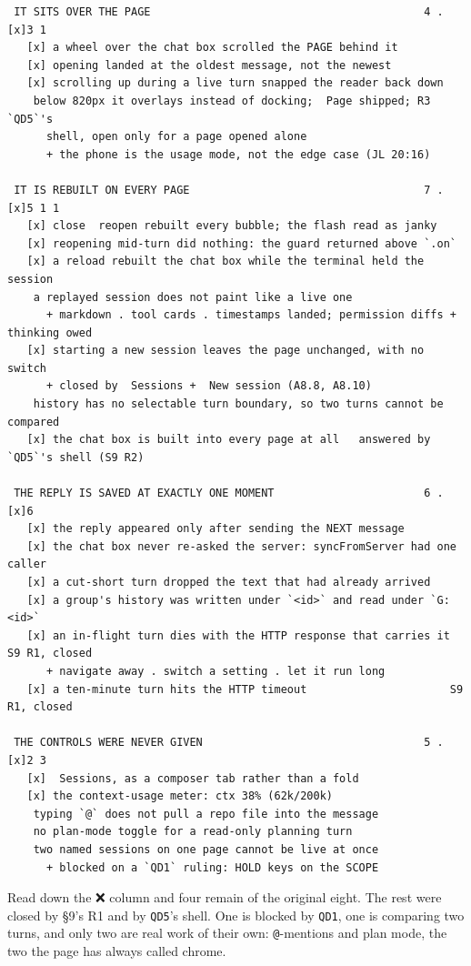 \begin{verbatim}
 IT SITS OVER THE PAGE                                          4 . [x]3 1
   [x] a wheel over the chat box scrolled the PAGE behind it
   [x] opening landed at the oldest message, not the newest
   [x] scrolling up during a live turn snapped the reader back down
    below 820px it overlays instead of docking;  Page shipped; R3  `QD5`'s
      shell, open only for a page opened alone
      + the phone is the usage mode, not the edge case (JL 20:16)

 IT IS REBUILT ON EVERY PAGE                                    7 . [x]5 1 1
   [x] close  reopen rebuilt every bubble; the flash read as janky
   [x] reopening mid-turn did nothing: the guard returned above `.on`
   [x] a reload rebuilt the chat box while the terminal held the session
    a replayed session does not paint like a live one
      + markdown . tool cards . timestamps landed; permission diffs +  thinking owed
   [x] starting a new session leaves the page unchanged, with no switch
      + closed by  Sessions +  New session (A8.8, A8.10)
    history has no selectable turn boundary, so two turns cannot be compared
   [x] the chat box is built into every page at all   answered by `QD5`'s shell (S9 R2)

 THE REPLY IS SAVED AT EXACTLY ONE MOMENT                       6 . [x]6
   [x] the reply appeared only after sending the NEXT message
   [x] the chat box never re-asked the server: syncFromServer had one caller
   [x] a cut-short turn dropped the text that had already arrived
   [x] a group's history was written under `<id>` and read under `G:<id>`
   [x] an in-flight turn dies with the HTTP response that carries it  S9 R1, closed
      + navigate away . switch a setting . let it run long
   [x] a ten-minute turn hits the HTTP timeout                      S9 R1, closed

 THE CONTROLS WERE NEVER GIVEN                                  5 . [x]2 3
   [x]  Sessions, as a composer tab rather than a fold
   [x] the context-usage meter: ctx 38% (62k/200k)
    typing `@` does not pull a repo file into the message
    no plan-mode toggle for a read-only planning turn
    two named sessions on one page cannot be live at once
      + blocked on a `QD1` ruling: HOLD keys on the SCOPE
\end{verbatim}
Read down the ❌ column and four remain of the original eight. The rest were closed by §9's R1 and by \texttt{QD5}'s shell. One is blocked by \texttt{QD1}, one is comparing two turns, and only two are real work of their own: \texttt{@}-mentions and plan mode, the two the page has always called chrome.

